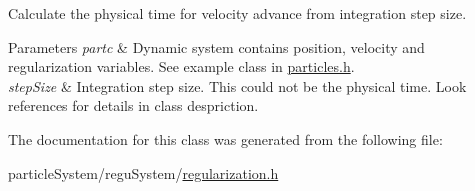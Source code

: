 Calculate the physical time for velocity advance from integration step size. 


\begin{DoxyParams}{Parameters}
{\em partc} & Dynamic system contains position, velocity and regularization variables. See example class in \mbox{\hyperlink{particles_8h}{particles.\+h}}. \\
\hline
{\em step\+Size} & Integration step size. This could not be the physical time. Look references for details in class despriction. \\
\hline
\end{DoxyParams}


The documentation for this class was generated from the following file\+:\begin{DoxyCompactItemize}
\item 
particle\+System/regu\+System/\mbox{\hyperlink{regularization_8h}{regularization.\+h}}\end{DoxyCompactItemize}
